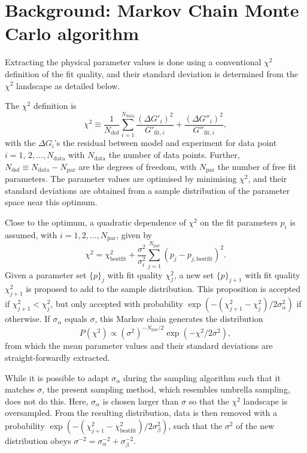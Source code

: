 \documentclass[  superscriptaddress]{revtex4}
\begin{document}
\section{Background: Markov Chain Monte Carlo algorithm}



Extracting the physical parameter values is done using a conventional $\chi^2$ definition of the fit quality, and their standard deviation is determined from the $\chi^2$ landscape as detailed below.

The $\chi^2$ definition is 
\begin{equation}
  \chi^2 \equiv \frac{1}{N_\mathrm{dof}}\sum_{i=1}^{N_\mathrm{data}}\frac{(\Delta G'_i)^2}{G'_{\mathrm{fit},i}}+\frac{(\Delta G''_i)^2}{G''_{\mathrm{fit},i}}, 
\end{equation}
with the $\Delta G_i$'s the residual between model and experiment for data point $i=1,\,2,\dots,N_\mathrm{data}$ with $N_\mathrm{data}$ the number of data points.
Further, $N_\mathrm{dof}\equiv N_\mathrm{data}-N_\mathrm{par}$ are the degrees of freedom, with $N_\mathrm{par}$ the number of free fit parameters.
The parameter values are optimised by minimising $\chi^2$, and their standard deviations are obtained from a sample distribution of the parameter space near this optimum.

Close to the optimum, a quadratic dependence of $\chi^2$ on the fit parameters $p_i$ is assumed, with $i=1,2,\dots,N_\mathrm{par}$, given by 
\begin{equation}
  \chi^2 = \chi_\mathrm{best fit}^2 + \frac{\sigma^2}{\sigma_i^2}\sum_{j=1}^{N_\mathrm{par}}(p_j - p_{j,\mathrm{best fit}})^2.
\end{equation}
Given a parameter set $\{p\}_j$ with fit quality $\chi_j^2$, a new set $\{p\}_{j+1}$ with fit quality $\chi_{j+1}^2$ is proposed to add to the sample distribution.
This proposition is accepted if $\chi_{j+1}^2< \chi_{j}^2$, but only accepted with probability $\exp(-(\chi_{j+1}^2-\chi_{j}^2)/2\sigma_{\alpha}^2)$ if otherwise.
If $\sigma_\mathrm{\alpha}$ equals $\sigma$, this Markov chain generates the distribution
\begin{equation}
  P(\chi^2) \propto (\sigma^{2})^{-N_\mathrm{par}/2} \exp\left( -\chi^2/2\sigma^2\right),
\end{equation}
from which the mean parameter values and their standard deviations are straight-forwardly extracted.

While it is possible to adapt $\sigma_{\alpha}$ during the sampling algorithm such that it matches $\sigma$, the present sampling method, which resembles umbrella sampling, does not do this.
Here, $\sigma_\alpha$ is chosen larger than $\sigma$ so that the $\chi^2$ landscape is oversampled. From the resulting distribution, data is then removed with a probability $\exp(-(\chi_{j+1}^2-\chi_{\mathrm{best fit}}^2)/2\sigma_{\beta}^2)$, such that the $\sigma^2$ of the new distribution obeys $\sigma^{-2} = \sigma_\alpha^{-2} + \sigma_\beta^{-2}$.
\end{document}
